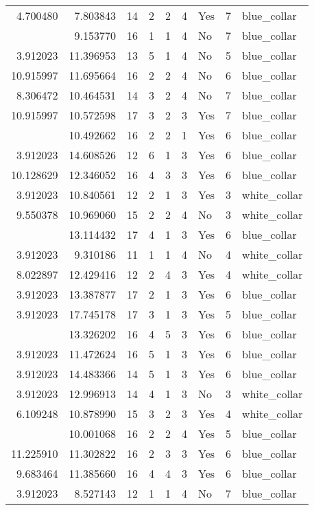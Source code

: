 \documentclass[
]{article}
\begin{document}
\begin{longtable}[t]{rrrrrllrl}
4.700480 & 7.803843 & 14 & 2 & 2 & 4 & Yes & 7 & blue\_collar\\
\addlinespace
3.912023 & 9.153770 & 16 & 1 & 1 & 4 & No & 7 & blue\_collar\\
3.912023 & 11.396953 & 13 & 5 & 1 & 4 & No & 5 & blue\_collar\\
10.915997 & 11.695664 & 16 & 2 & 2 & 4 & No & 6 & blue\_collar\\
8.306472 & 10.464531 & 14 & 3 & 2 & 4 & No & 7 & blue\_collar\\
10.915997 & 10.572598 & 17 & 3 & 2 & 3 & Yes & 7 & blue\_collar\\
\addlinespace
8.707814 & 10.492662 & 16 & 2 & 2 & 1 & Yes & 6 & blue\_collar\\
3.912023 & 14.608526 & 12 & 6 & 1 & 3 & Yes & 6 & blue\_collar\\
10.128629 & 12.346052 & 16 & 4 & 3 & 3 & Yes & 6 & blue\_collar\\
3.912023 & 10.840561 & 12 & 2 & 1 & 3 & Yes & 3 & white\_collar\\
9.550378 & 10.969060 & 15 & 2 & 2 & 4 & No & 3 & white\_collar\\
\addlinespace
3.912023 & 13.114432 & 17 & 4 & 1 & 3 & Yes & 6 & blue\_collar\\
3.912023 & 9.310186 & 11 & 1 & 1 & 4 & No & 4 & white\_collar\\
8.022897 & 12.429416 & 12 & 2 & 4 & 3 & Yes & 4 & white\_collar\\
3.912023 & 13.387877 & 17 & 2 & 1 & 3 & Yes & 6 & blue\_collar\\
3.912023 & 17.745178 & 17 & 3 & 1 & 3 & Yes & 5 & blue\_collar\\
\addlinespace
11.225910 & 13.326202 & 16 & 4 & 5 & 3 & Yes & 6 & blue\_collar\\
3.912023 & 11.472624 & 16 & 5 & 1 & 3 & Yes & 6 & blue\_collar\\
3.912023 & 14.483366 & 14 & 5 & 1 & 3 & Yes & 6 & blue\_collar\\
3.912023 & 12.996913 & 14 & 4 & 1 & 3 & No & 3 & white\_collar\\
6.109248 & 10.878990 & 15 & 3 & 2 & 3 & Yes & 4 & white\_collar\\
\addlinespace
7.625595 & 10.001068 & 16 & 2 & 2 & 4 & Yes & 5 & blue\_collar\\
11.225910 & 11.302822 & 16 & 2 & 3 & 3 & Yes & 6 & blue\_collar\\
9.683464 & 11.385660 & 16 & 4 & 4 & 3 & Yes & 6 & blue\_collar\\
3.912023 & 8.527143 & 12 & 1 & 1 & 4 & No & 7 & blue\_collar\\

\end{longtable}
\end{document}

